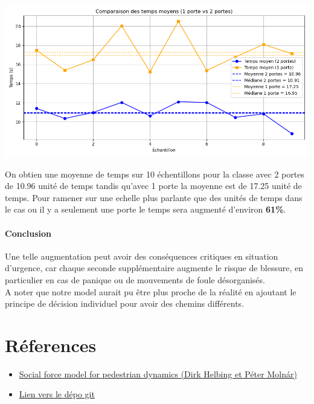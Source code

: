 \documentclass[a4paper,12pt]{article}
\begin{document}
\includegraphics[width=\textwidth]{resultat_2.png} %

On obtien une moyenne de temps sur 10 échentillons pour la classe avec 2 portes de 10.96 unité de temps tandis qu'avec 1 porte la moyenne est de 17.25 unité de temps. Pour ramener sur une echelle plus parlante que des unités de temps dans le cas ou il y a seulement une porte le temps sera augmenté d'environ \textbf{61\%}. 
\paragraph{Conclusion} Une telle augmentation peut avoir des conséquences critiques en situation d'urgence, car chaque seconde supplémentaire augmente le risque de blessure, en particulier en cas de panique ou de mouvements de foule désorganisés. \\ \indent A noter que notre model aurait pu être plus proche de la réalité en ajoutant le principe de décision individuel pour avoir des chemins différents.

\newpage



\section{Réferences}


\vspace{1em}

\begin{itemize}
	\item \href{https://journals.aps.org/pre/abstract/10.1103/PhysRevE.51.4282}{Social force model for pedestrian dynamics (Dirk Helbing et Péter Molnár)}
	\item \href{https://github.com/antoninnad/etude_des_foules}{Lien vers le dépo git}
\end{itemize}
\end{document}

